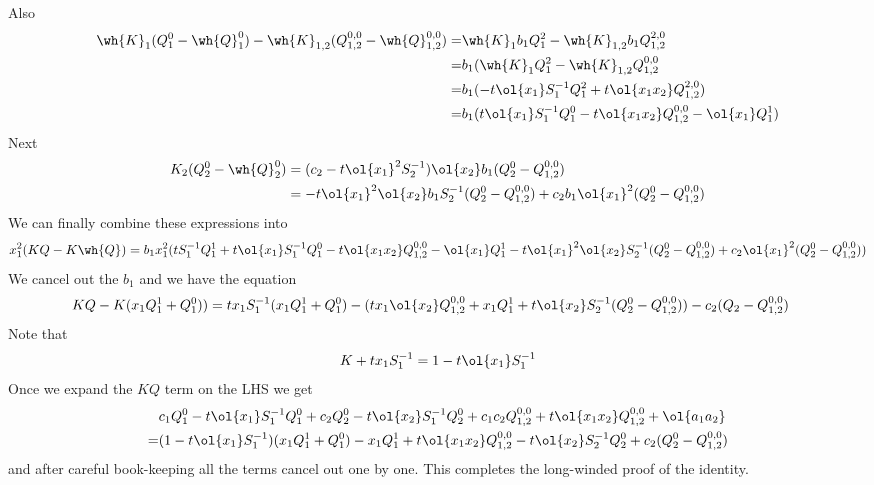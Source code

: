 Also
\begin{align}
 \wh{K}_1(Q_1^0-\wh{Q}_1^0) -\wh{K}_{1,2}(Q_{1,2}^{0,0}-\wh{Q}_{1,2}^{0,0})=&\wh{K}_1b_1Q_1^2-\wh{K}_{1,2}b_1Q_{1,2}^{2,0}\\
=&b_1(\wh{K}_1Q_1^2-\wh{K}_{1,2}Q_{1,2}^{0,0}\\
=&b_1(-t\ol{x_1}S_1^{-1}Q_1^2+t\ol{x_1x_2}Q_{1,2}^{2,0}) \\
=&b_1(t\ol{x_1}S_1^{-1}Q_1^0-t\ol{x_1x_2}Q_{1,2}^{0,0}-\ol{x_1}Q_1^1)
\end{align}
Next
\begin{align}
K_2(Q_2^0-\wh{Q}_2^0) &=(c_2 -t\ol{x_1}^2S_2^{-1})\ol{x_2}b_1(Q_2^0-Q_{1,2}^{0,0})\\ 
                                                     &=-t\ol{x_1}^2\ol{x_2}b_1S_2^{-1}(Q_2^0-Q_{1,2}^{0,0})+c_2b_1\ol{x_1}^2(Q_2^0-Q_{1,2}^{0,0})
\end{align}
We can finally combine these expressions into
\begin{align}
x_1^2(KQ-K\wh{Q}) = b_1x_1^2(tS_1^{-1}Q_1^1+t\ol{x_1}S_1^{-1}Q_1^0-t\ol{x_1x_2}Q_{1,2}^{0,0}-\ol{x_1}Q_1^1-t\ol{x_1}^2\ol{x_2}S_2^{-1}(Q_2^0-Q_{1,2}^{0,0})+c_2\ol{x_1}^2(Q_2^0-Q_{1,2}^{0,0}))
\end{align}
We cancel out the $b_1$ and we have the equation
\begin{align}
KQ-K(x_1Q_1^1+Q_1^0)) &= tx_1S_1^{-1}(x_1Q_1^1+Q_1^0) - (tx_1\ol{x_2}Q_{1,2}^{0,0}+x_1Q_1^1+t\ol{x_2}S_2^{-1}(Q_2^0-Q_{1,2}^{0,0}))-c_2(Q_2-Q_{1,2}^{0,0})
\end{align}
Note that
\begin{align}
  K+tx_1S_1^{-1} = 1- t\ol{x_1}S_1^{-1}
\end{align}
Once we expand the $KQ$ term on the LHS we get
\begin{align}
&c_1Q_1^0-t\ol{x_1}S_1^{-1}Q_1^0+c_2Q_2^0-t\ol{x_2}S_1^{-1}Q_2^0+c_1c_2Q_{1,2}^{0,0}+t\ol{x_1x_2}Q_{1,2}^{0,0}+\ol{a_1a_2}\\
=&(1-t\ol{x_1}S_1^{-1})(x_1Q_1^1+Q_1^0)-x_1Q_1^1+t\ol{x_1x_2}Q_{1,2}^{0,0}-t\ol{x_2}S_2^{-1}Q_2^0+c_2(Q_2^0-Q_{1,2}^{0,0})
\end{align}
and after careful book-keeping all the terms cancel out one by one. This completes the long-winded proof of the identity.


\endinput
